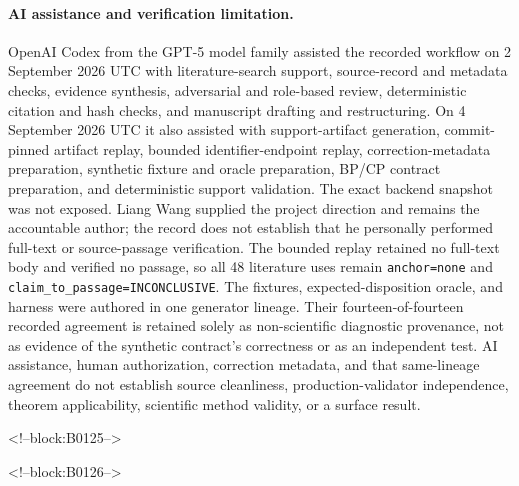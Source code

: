 \documentclass[11pt,a4paper]{article}
\begin{document}
\paragraph{AI assistance and verification limitation.}
OpenAI Codex from the GPT-5 model family assisted the recorded workflow on 2 September 2026 UTC with literature-search support, source-record and metadata checks, evidence synthesis, adversarial and role-based review, deterministic citation and hash checks, and manuscript drafting and restructuring. On 4 September 2026 UTC it also assisted with support-artifact generation, commit-pinned artifact replay, bounded identifier-endpoint replay, correction-metadata preparation, synthetic fixture and oracle preparation, BP/CP contract preparation, and deterministic support validation. The exact backend snapshot was not exposed. Liang Wang supplied the project direction and remains the accountable author; the record does not establish that he personally performed full-text or source-passage verification. The bounded replay retained no full-text body and verified no passage, so all 48 literature uses remain \texttt{anchor=none} and \texttt{claim\_to\_passage=INCONCLUSIVE}. The fixtures, expected-disposition oracle, and harness were authored in one generator lineage. Their fourteen-of-fourteen recorded agreement is retained solely as non-scientific diagnostic provenance, not as evidence of the synthetic contract's correctness or as an independent test. AI assistance, human authorization, correction metadata, and that same-lineage agreement do not establish source cleanliness, production-validator independence, theorem applicability, scientific method validity, or a surface result.

<!--block:B0125-->



<!--block:B0126-->
\end{document}

